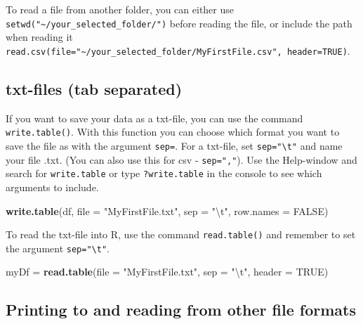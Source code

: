 \documentclass[]{article}
\newenvironment{Shaded}{\begin{snugshade}}{\end{snugshade}}
\newcommand{\KeywordTok}[1]{\textcolor[rgb]{0.13,0.29,0.53}{\textbf{#1}}}
\newcommand{\DataTypeTok}[1]{\textcolor[rgb]{0.13,0.29,0.53}{#1}}
\newcommand{\CharTok}[1]{\textcolor[rgb]{0.31,0.60,0.02}{#1}}
\newcommand{\StringTok}[1]{\textcolor[rgb]{0.31,0.60,0.02}{#1}}
\newcommand{\OtherTok}[1]{\textcolor[rgb]{0.56,0.35,0.01}{#1}}
\newcommand{\NormalTok}[1]{#1}
\begin{document}
To read a file from another folder, you can either use
\texttt{setwd("\textasciitilde{}/your\_selected\_folder/")} before
reading the file, or include the path when reading it
\texttt{read.csv(file="\textasciitilde{}/your\_selected\_folder/MyFirstFile.csv",\ header=TRUE)}.

\subsection{txt-files (tab separated)}\label{txt-files-tab-separated}

If you want to save your data as a txt-file, you can use the command
\texttt{write.table()}. With this function you can choose which format
you want to save the file as with the argument \texttt{sep=}. For a
txt-file, set \texttt{sep="\textbackslash{}t"} and name your file .txt.
(You can also use this for csv - \texttt{sep=","}). Use the Help-window
and search for \texttt{write.table} or type \texttt{?write.table} in the
console to see which arguments to include.

\begin{Shaded}
\begin{Highlighting}[]
\KeywordTok{write.table}\NormalTok{(df, }\DataTypeTok{file =} \StringTok{"MyFirstFile.txt"}\NormalTok{, }\DataTypeTok{sep =} \StringTok{"}\CharTok{\textbackslash{}t}\StringTok{"}\NormalTok{, }\DataTypeTok{row.names =} \OtherTok{FALSE}\NormalTok{)}
\end{Highlighting}
\end{Shaded}

To read the txt-file into R, use the command \texttt{read.table()} and
remember to set the argument \texttt{sep="\textbackslash{}t"}.

\begin{Shaded}
\begin{Highlighting}[]
\NormalTok{myDf =}\StringTok{ }\KeywordTok{read.table}\NormalTok{(}\DataTypeTok{file =} \StringTok{"MyFirstFile.txt"}\NormalTok{, }\DataTypeTok{sep =} \StringTok{"}\CharTok{\textbackslash{}t}\StringTok{"}\NormalTok{, }\DataTypeTok{header =} \OtherTok{TRUE}\NormalTok{)}
\end{Highlighting}
\end{Shaded}

\subsection{Printing to and reading from other file
formats}\label{printing-to-and-reading-from-other-file-formats}
\end{document}
